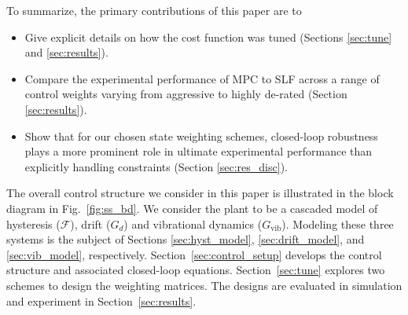\documentclass[twocolumn,twoside]{IEEEtran}
\newcommand{\Gv}{\ensuremath{G_{\text{vib}}}\xspace}
\begin{document}
To summarize, the primary contributions of this paper are to
\begin{itemize}
\item Give explicit details on how the cost function was tuned (Sections \ref{sec:tune} and \ref{sec:results}).
\item Compare the experimental performance of MPC to SLF across a range of control weights varying from aggressive to highly de-rated (Section \ref{sec:results}).
\item Show that for our chosen state weighting schemes, closed-loop robustness plays a more prominent role in ultimate experimental performance than explicitly handling constraints (Section \ref{sec:res_disc}).
\end{itemize}

The overall control structure we consider in this paper is illustrated in the block diagram in Fig.~\ref{fig:ss_bd}. We consider the plant to be a cascaded model of hysteresis ($\mathcal{F}$), drift ($G_d$) and vibrational dynamics ($\Gv$). Modeling these three systems is the subject of Sections \ref{sec:hyst_model}, \ref{sec:drift_model}, and \ref{sec:vib_model}, respectively. Section~\ref{sec:control_setup} develops the control structure and associated closed-loop equations. Section~\ref{sec:tune} explores two schemes to design the weighting matrices. The designs are evaluated in simulation and experiment in Section~\ref{sec:results}.

\end{document}
